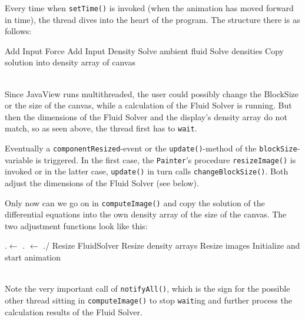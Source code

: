 \documentclass[a4paper,10pt,oneside,final,german,openbib,pdftex,titlepage]{scrbook}
\begin{document}
Every time when \texttt{setTime()} is invoked (when the animation has moved forward in time), the thread dives into the heart of the program. The structure there is as follows:\medskip\\
%
\begin{function}[H]
\DontPrintSemicolon
{}
\Fn{\setTime{}}
{
	\Fn{\cI{}}
	{
		Add Input Force\;
		Add Input Density\;
		\If{\isFrozen $==$ \false}
		{
			Solve ambient fluid\;
			Solve densities\;
		}
		\While{\incSize{}}{\wait{}\;}
		Copy solution into density array of canvas\;
		\cC{}\;
	}
}
\end{function}
\hfill\medskip\\
%
Since JavaView runs multithreaded, the user could possibly change the BlockSize or the size of the canvas, while a calculation of the Fluid Solver is running. But then the dimensions of the Fluid Solver and the display's density array do not match, so as seen above, the thread first has to \texttt{wait}.

Eventually a \texttt{componentResized}-event or the \texttt{update()}-method of the \texttt{blockSize}-variable is triggered. In the first case, the \texttt{Painter}'s procedure \texttt{resizeImage()} is invoked or in the latter case, \texttt{update()} in turn calls \texttt{changeBlockSize()}. Both adjust the dimensions of the Fluid Solver (see below).

Only now can we go on in \texttt{computeImage()} and copy the solution of the differential equations into the own density array of the size of the canvas. The two adjustment functions look like this:\medskip\\
%
\begin{function}[H]
\DontPrintSemicolon
{}
\Fn{\rI{}}
{
	{
		\this.\size $\leftarrow$ \disp.\size\;
		\res $\leftarrow$ \this.\size /\bs\;
		Resize FluidSolver\;
		Resize density arrays\;
		Resize images\;
		Initialize and start animation\;
	}
	\nA{}\;
}
\end{function}
\hfill\medskip\\
%
Note the very important call of \texttt{notifyAll()}, which is the sign for the possible other thread sitting in \texttt{computeImage()} to stop \texttt{wait}ing and further process the calculation results of the Fluid Solver.
\end{document}
